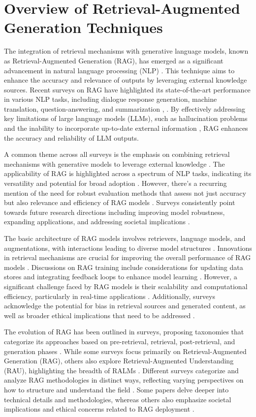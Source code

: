 \documentclass[conference]{IEEEtran}
\begin{document}
\section{Overview of Retrieval-Augmented Generation Techniques}
The integration of retrieval mechanisms with generative language models, known as Retrieval-Augmented Generation (RAG), has emerged as a significant advancement in natural language processing (NLP) \cite{b1}. This technique aims to enhance the accuracy and relevance of outputs by leveraging external knowledge sources. Recent surveys on RAG have highlighted its state-of-the-art performance in various NLP tasks, including dialogue response generation, machine translation, question-answering, and summarization \cite{b2}, \cite{b3}. By effectively addressing key limitations of large language models (LLMs), such as hallucination problems and the inability to incorporate up-to-date external information \cite{b4}, RAG enhances the accuracy and reliability of LLM outputs.

A common theme across all surveys is the emphasis on combining retrieval mechanisms with generative models to leverage external knowledge \cite{b5}. The applicability of RAG is highlighted across a spectrum of NLP tasks, indicating its versatility and potential for broad adoption \cite{b6}. However, there's a recurring mention of the need for robust evaluation methods that assess not just accuracy but also relevance and efficiency of RAG models \cite{b7}. Surveys consistently point towards future research directions including improving model robustness, expanding applications, and addressing societal implications \cite{b8}.

The basic architecture of RAG models involves retrievers, language models, and augmentations, with interactions leading to diverse model structures \cite{b9}. Innovations in retrieval mechanisms are crucial for improving the overall performance of RAG models \cite{b10}. Discussions on RAG training include considerations for updating data stores and integrating feedback loops to enhance model learning \cite{b11}. However, a significant challenge faced by RAG models is their scalability and computational efficiency, particularly in real-time applications \cite{b12}. Additionally, surveys acknowledge the potential for bias in retrieval sources and generated content, as well as broader ethical implications that need to be addressed \cite{b13}.

The evolution of RAG has been outlined in surveys, proposing taxonomies that categorize its approaches based on pre-retrieval, retrieval, post-retrieval, and generation phases \cite{b14}. While some surveys focus primarily on Retrieval-Augmented Generation (RAG), others also explore Retrieval-Augmented Understanding (RAU), highlighting the breadth of RALMs \cite{b15}. Different surveys categorize and analyze RAG methodologies in distinct ways, reflecting varying perspectives on how to structure and understand the field \cite{b16}. Some papers delve deeper into technical details and methodologies, whereas others also emphasize societal implications and ethical concerns related to RAG deployment \cite{b17}.
\end{document}
